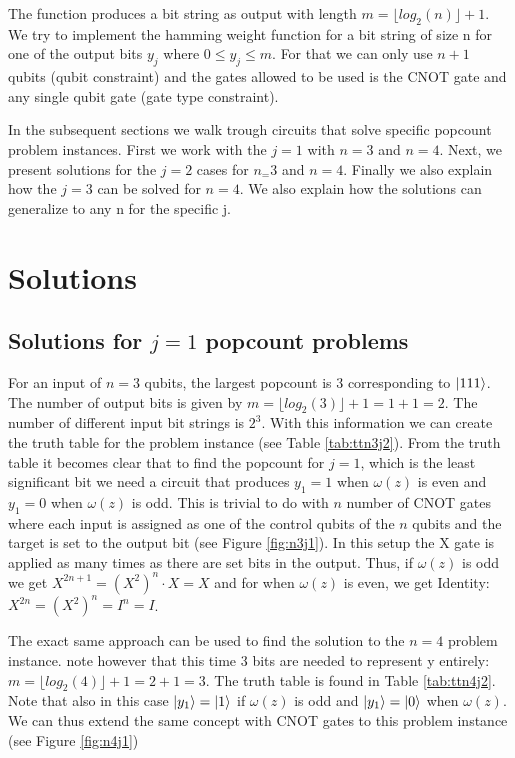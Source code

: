 \documentclass[12pt,a4paper]{article}
\begin{document}
The function produces a bit string as output with length \(m = \lfloor log_2(n) \rfloor + 1\). We try to implement the hamming weight function for a bit string of size n for one of the output bits \(y_j\) where \(0 \le y_j \le m \). For that we can only use \(n+1\) qubits (qubit constraint) and the gates allowed to be used is the CNOT gate and any single qubit gate (gate type constraint). 

In the subsequent sections we walk trough circuits that solve specific popcount problem instances. First we work with the \(j=1\) with \(n=3\) and \(n=4\). Next, we present solutions for the \(j=2\) cases for \(n_=3\) and \(n=4\). Finally we also explain how the \(j=3\) can be solved for \(n=4\). We also explain how the solutions can generalize to any n for the specific j. 


\section{Solutions}
\subsection{Solutions for \(j=1\) popcount problems}
For an input of \(n=3\) qubits, the largest popcount is 3 corresponding to $\ket{111}$. The number of output bits is given by \(m = \lfloor log_2(3)\rfloor + 1 = 1 + 1 = 2\). The number of different input bit strings is \(2^3\). With this information we can create the truth table for the problem instance (see Table \ref{tab:ttn3j2}). From the truth table it becomes clear that to find the popcount for \(j = 1\), which is the least significant bit we need a circuit that produces \(y_1 = 1\) when \(\omega(z)\) is even and \(y_1 = 0\) when \(\omega(z)\) is odd. This is trivial to do with $n$ number of CNOT gates where each input is assigned as one of the control qubits of the \(n\) qubits and the target is set to the output bit (see Figure \ref{fig:n3j1}). In this setup the X gate is applied as many times as there are set bits in the output. Thus, if \(\omega(z)\) is odd we get \(X^{2n+1} = (X^{2})^{n} \cdot X = X\) and for when \(\omega(z)\) is even, we get Identity: \(X^{2n} = (X^2)^{n} = I^n = I\). 

The exact same approach can be used to find the solution to the \(n = 4\) problem instance. note however that this time 3 bits are needed to represent y entirely: \(m = \lfloor log_2(4)\rfloor + 1 = 2 + 1 = 3\). The truth table is found in Table \ref{tab:ttn4j2}. Note that also in this case \(\ket{y_1} = \ket{1}\) if \(\omega(z)\) is odd and \(\ket{y_1} = \ket{0}\) when \(\omega(z)\). We can thus extend the same concept with CNOT gates to this problem instance (see Figure \ref{fig:n4j1})
\end{document}
